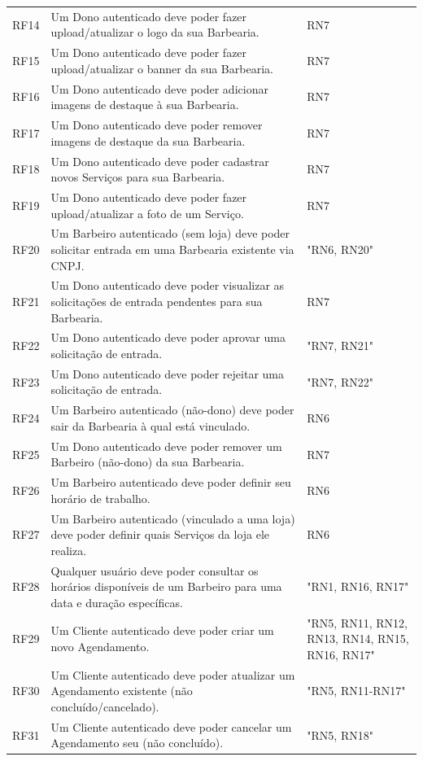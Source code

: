\documentclass[
    12pt, 
    a4paper, 
    oneside, 
    chapter=TITLE, 
    section=TITLE
]{abntex2}
\begin{document}
\begin{longtable}{p{1.5cm} p{10.5cm} p{2cm}}
    RF14 & Um Dono autenticado deve poder fazer upload/atualizar o logo da sua Barbearia. & RN7 \\
    RF15 & Um Dono autenticado deve poder fazer upload/atualizar o banner da sua Barbearia. & RN7 \\
    RF16 & Um Dono autenticado deve poder adicionar imagens de destaque à sua Barbearia. & RN7 \\
    RF17 & Um Dono autenticado deve poder remover imagens de destaque da sua Barbearia. & RN7 \\
    RF18 & Um Dono autenticado deve poder cadastrar novos Serviços para sua Barbearia. & RN7 \\
    RF19 & Um Dono autenticado deve poder fazer upload/atualizar a foto de um Serviço. & RN7 \\
    RF20 & Um Barbeiro autenticado (sem loja) deve poder solicitar entrada em uma Barbearia existente via CNPJ. & "RN6, RN20" \\
    RF21 & Um Dono autenticado deve poder visualizar as solicitações de entrada pendentes para sua Barbearia. & RN7 \\
    RF22 & Um Dono autenticado deve poder aprovar uma solicitação de entrada. & "RN7, RN21" \\
    RF23 & Um Dono autenticado deve poder rejeitar uma solicitação de entrada. & "RN7, RN22" \\
    RF24 & Um Barbeiro autenticado (não-dono) deve poder sair da Barbearia à qual está vinculado. & RN6 \\
    RF25 & Um Dono autenticado deve poder remover um Barbeiro (não-dono) da sua Barbearia. & RN7 \\
    RF26 & Um Barbeiro autenticado deve poder definir seu horário de trabalho. & RN6 \\
    RF27 & Um Barbeiro autenticado (vinculado a uma loja) deve poder definir quais Serviços da loja ele realiza. & RN6 \\
    RF28 & Qualquer usuário deve poder consultar os horários disponíveis de um Barbeiro para uma data e duração específicas. & "RN1, RN16, RN17" \\
    RF29 & Um Cliente autenticado deve poder criar um novo Agendamento. & "RN5, RN11, RN12, RN13, RN14, RN15, RN16, RN17" \\
    RF30 & Um Cliente autenticado deve poder atualizar um Agendamento existente (não concluído/cancelado). & "RN5, RN11-RN17" \\
    RF31 & Um Cliente autenticado deve poder cancelar um Agendamento seu (não concluído). & "RN5, RN18" \\

\end{longtable}
\end{document}
